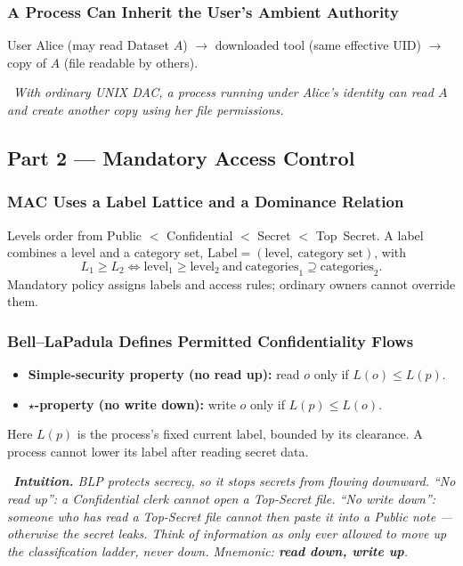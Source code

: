 \documentclass[hidelinks]{article}
\newcommand{\callout}[1]{\par\smallskip\noindent{\color{capri}$\blacktriangleright$}\ \textit{#1}\par\smallskip}
\begin{document}
\subsubsection{A Process Can Inherit the User's Ambient Authority}

User Alice (may read Dataset $A$) $\to$ downloaded tool (same effective UID) $\to$ copy of $A$ (file readable by others).

\callout{With ordinary UNIX DAC, a process running under Alice's identity can read $A$ and create another copy using her file permissions.}

\subsection{Part 2 --- Mandatory Access Control}

\subsubsection{MAC Uses a Label Lattice and a Dominance Relation}

Levels order from Public $<$ Confidential $<$ Secret $<$ Top~Secret. A label combines a level and a category set, $\text{Label} = (\text{level},\ \text{category set})$, with
\[
L_1 \ge L_2 \iff \text{level}_1 \ge \text{level}_2 \ \text{and}\ \text{categories}_1 \supseteq \text{categories}_2 .
\]
Mandatory policy assigns labels and access rules; ordinary owners cannot override them.

\subsubsection{Bell--LaPadula Defines Permitted Confidentiality Flows}

\begin{itemize}
    \item \textbf{Simple-security property (no read up):} read $o$ only if $L(o) \le L(p)$.
    \item \textbf{$\star$-property (no write down):} write $o$ only if $L(p) \le L(o)$.
\end{itemize}
Here $L(p)$ is the process's fixed current label, bounded by its clearance. A process cannot lower its label after reading secret data.

\callout{\textbf{Intuition.} BLP protects \emph{secrecy}, so it stops secrets from flowing \emph{downward}. ``No read up'': a Confidential clerk cannot open a Top-Secret file. ``No write down'': someone who has read a Top-Secret file cannot then paste it into a Public note --- otherwise the secret leaks. Think of information as only ever allowed to move \emph{up} the classification ladder, never down. Mnemonic: \textbf{read down, write up}.}
\end{document}
